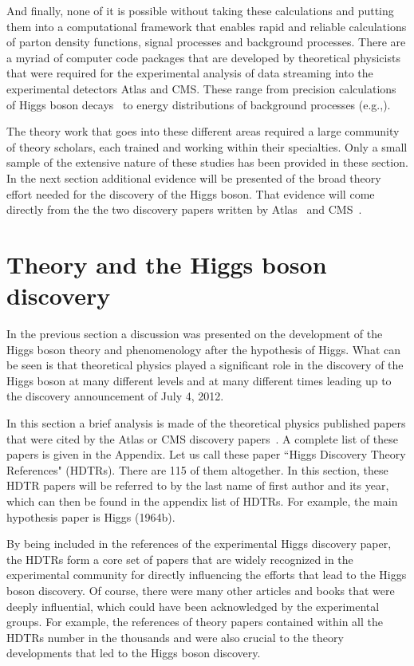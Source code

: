 \documentclass[letter,12pt]{article}
\begin{document}
And finally, none of it is possible without taking these calculations and putting them into a computational framework that enables rapid and reliable calculations of parton density functions, signal processes and background processes.  There are a myriad of computer code packages that are developed by theoretical physicists that were required for the experimental analysis of data streaming into the experimental detectors Atlas and CMS.  These range from precision calculations of Higgs boson decays~\cite{Djouadi:1997yw} to energy distributions of background processes (e.g.,\cite{Mangano:2002ea}).

The theory work that goes into these different areas required a large community of theory scholars, each trained and working within their specialties. Only a small sample of the extensive nature of these studies has been provided in these section. In the next section additional evidence will be presented of the broad theory effort needed for the discovery of the Higgs boson. That evidence will come directly from the the two discovery papers written by Atlas~\cite{Aad:2012tfa} and CMS~\cite{Chatrchyan:2012xdj}.

\section{Theory and the Higgs boson discovery}
\label{sec:ecosystem}

In the previous section a discussion was presented on the development of the Higgs boson theory and phenomenology after the hypothesis of Higgs. What can be seen is that theoretical physics played a significant role in the discovery of the Higgs boson at many different levels and at many different times leading up to the discovery announcement of July 4, 2012.

In this section a brief analysis is made of the theoretical physics published papers that were cited by the Atlas or CMS discovery papers~\cite{Aad:2012tfa,Chatrchyan:2012xdj}. A complete list of these papers is given in the Appendix. Let us call these paper ``Higgs Discovery Theory References" (HDTRs). There are 115 of them altogether. In this section, these HDTR papers will be referred to by the last name of first author and its year, which can then be found in the appendix list of HDTRs. For example, the main hypothesis paper is Higgs (1964b).

By being included in the references of the experimental Higgs discovery paper, the HDTRs form a core set of papers that are widely recognized in the experimental community for directly influencing the efforts that lead to the Higgs boson discovery. Of course, there were many other articles and books that were deeply influential, which could have been acknowledged by the experimental groups. For example, the references of theory papers contained within all the HDTRs number in the thousands and were also crucial to the theory developments that led to the Higgs boson discovery.
\end{document}
